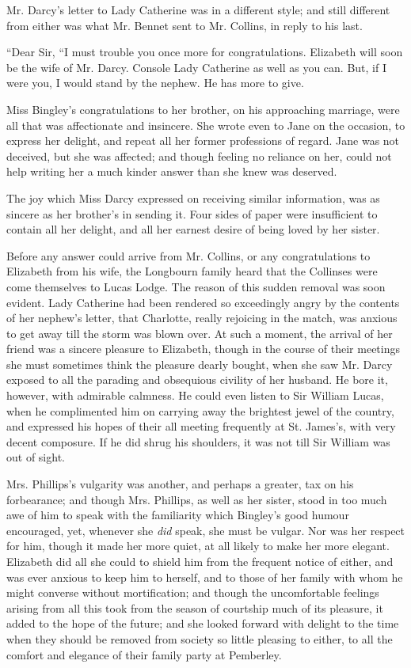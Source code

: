 Mr. Darcy's letter to Lady Catherine was in a different style; and still different from either was what Mr. Bennet sent to Mr. Collins, in reply to his last.

“Dear Sir,\crlf
“I must trouble you once more for congratulations. Elizabeth will soon be the wife of Mr. Darcy. Console Lady Catherine as well as you can. But, if I were you, I would stand by the nephew. He has more to give.


Miss Bingley's congratulations to her brother, on his approaching marriage, were all that was affectionate and insincere. She wrote even to Jane on the occasion, to express her delight, and repeat all her former professions of regard. Jane was not deceived, but she was affected; and though feeling no reliance on her, could not help writing her a much kinder answer than she knew was deserved.

The joy which Miss Darcy expressed on receiving similar information, was as sincere as her brother's in sending it. Four sides of paper were insufficient to contain all her delight, and all her earnest desire of being loved by her sister.

Before any answer could arrive from Mr. Collins, or any congratulations to Elizabeth from his wife, the Longbourn family heard that the Collinses were come themselves to Lucas Lodge. The reason of this sudden removal was soon evident. Lady Catherine had been rendered so exceedingly angry by the contents of her nephew's letter, that Charlotte, really rejoicing in the match, was anxious to get away till the storm was blown over. At such a moment, the arrival of her friend was a sincere pleasure to Elizabeth, though in the course of their meetings she must sometimes think the pleasure dearly bought, when she saw Mr. Darcy exposed to all the parading and obsequious civility of her husband. He bore it, however, with admirable calmness. He could even listen to Sir William Lucas, when he complimented him on carrying away the brightest jewel of the country, and expressed his hopes of their all meeting frequently at St. James's, with very decent composure. If he did shrug his shoulders, it was not till Sir William was out of sight.

Mrs. Phillips's vulgarity was another, and perhaps a greater, tax on his forbearance; and though Mrs. Phillips, as well as her sister, stood in too much awe of him to speak with the familiarity which Bingley's good humour encouraged, yet, whenever she {\em did} speak, she must be vulgar. Nor was her respect for him, though it made her more quiet, at all likely to make her more elegant. Elizabeth did all she could to shield him from the frequent notice of either, and was ever anxious to keep him to herself, and to those of her family with whom he might converse without mortification; and though the uncomfortable feelings arising from all this took from the season of courtship much of its pleasure, it added to the hope of the future; and she looked forward with delight to the time when they should be removed from society so little pleasing to either, to all the comfort and elegance of their family party at Pemberley.

